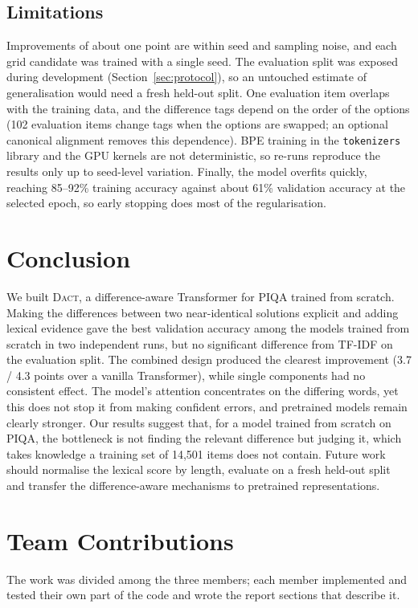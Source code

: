 \documentclass[11pt]{article}
\newcommand{\dact}{\textsc{Dact}}
\begin{document}
\subsection{Limitations}\label{sec:limits}
Improvements of about one point are within seed and sampling noise, and each grid candidate was trained with a single seed. The evaluation split was exposed during development (Section~\ref{sec:protocol}), so an untouched estimate of generalisation would need a fresh held-out split. One evaluation item overlaps with the training data, and the difference tags depend on the order of the options (102 evaluation items change tags when the options are swapped; an optional canonical alignment removes this dependence). BPE training in the \texttt{tokenizers} library and the GPU kernels are not deterministic, so re-runs reproduce the results only up to seed-level variation. Finally, the model overfits quickly, reaching 85--92\% training accuracy against about 61\% validation accuracy at the selected epoch, so early stopping does most of the regularisation.

\section{Conclusion}
We built \dact{}, a difference-aware Transformer for PIQA trained from scratch. Making the differences between two near-identical solutions explicit and adding lexical evidence gave the best validation accuracy among the models trained from scratch in two independent runs, but no significant difference from TF-IDF on the evaluation split. The combined design produced the clearest improvement (3.7 / 4.3 points over a vanilla Transformer), while single components had no consistent effect. The model's attention concentrates on the differing words, yet this does not stop it from making confident errors, and pretrained models remain clearly stronger. Our results suggest that, for a model trained from scratch on PIQA, the bottleneck is not finding the relevant difference but judging it, which takes knowledge a training set of 14{,}501 items does not contain. Future work should normalise the lexical score by length, evaluate on a fresh held-out split and transfer the difference-aware mechanisms to pretrained representations.

\section*{Team Contributions}
The work was divided among the three members; each member implemented and tested their own part of the code and wrote the report sections that describe it.
\end{document}
